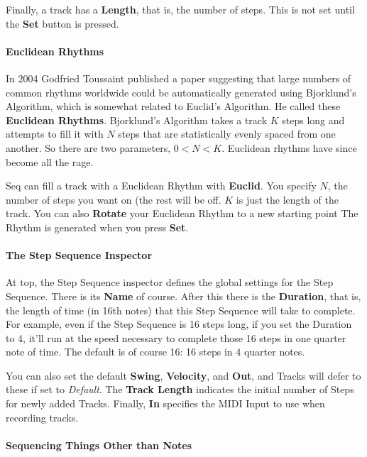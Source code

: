 \documentclass[twoside,10pt]{article}
\begin{document}
Finally, a track has a {\bf Length}, that is, the number of steps.  This is not set until the {\bf Set} button is pressed.

\paragraph{Euclidean Rhythms}

In 2004 Godfried Toussaint published a paper suggesting that large numbers of common rhythms worldwide could be automatically generated using Bjorklund's Algorithm, which is somewhat related to Euclid's Algorithm.  He called these {\bf Euclidean Rhythms}.  Bjorklund's Algorithm takes a track \(K\) steps long and attempts to fill it with \(N\) steps that are statistically evenly spaced from one another.  So there are two parameters, \(0 < N < K\).  Euclidean rhythms have since become all the rage.

Seq can fill a track with a Euclidean Rhythm with {\bf Euclid}.  You specify \(N\), the number of steps you want on (the rest will be off.  \(K\) is just the length of the track.  You can also {\bf Rotate} your Euclidean Rhythm to a new starting point  The Rhythm is generated when you press {\bf Set}.

\paragraph{The Step Sequence Inspector}

At top, the Step Sequence inspector defines the global settings for the Step Sequence.  There is its {\bf Name} of course.  After this there is the {\bf Duration}, that is, the length of time (in 16th notes) that this Step Sequence will take to complete.  For example, even if the Step Sequence is 16 steps long, if you set the Duration to 4, it'll run at the speed necessary to complete those 16 steps in one quarter note of time.  The default is of course 16: 16 steps in 4 quarter notes.

You can also set the default {\bf Swing}, {\bf Velocity}, and {\bf Out}, and Tracks will defer to these if set to {\it Default}.  The {\bf Track Length} indicates the initial number of Steps for newly added Tracks. Finally, {\bf In} specifies the MIDI Input to use when recording tracks.

\paragraph{Sequencing Things Other than Notes}
\end{document}
